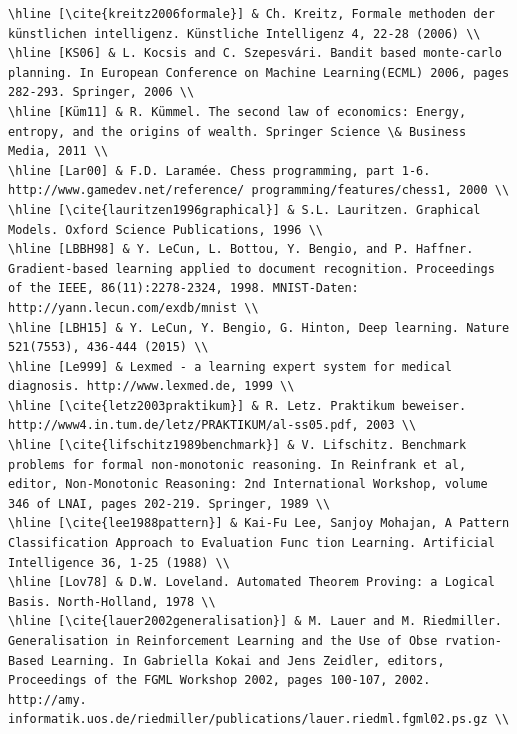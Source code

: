 \documentclass[10pt]{article}
\begin{document}
\begin{verbatim}
\hline [\cite{kreitz2006formale}] & Ch. Kreitz, Formale methoden der künstlichen intelligenz. Künstliche Intelligenz 4, 22-28 (2006) \\
\hline [KS06] & L. Kocsis and C. Szepesvári. Bandit based monte-carlo planning. In European Conference on Machine Learning(ECML) 2006, pages 282-293. Springer, 2006 \\
\hline [Küm11] & R. Kümmel. The second law of economics: Energy, entropy, and the origins of wealth. Springer Science \& Business Media, 2011 \\
\hline [Lar00] & F.D. Laramée. Chess programming, part 1-6. http://www.gamedev.net/reference/ programming/features/chess1, 2000 \\
\hline [\cite{lauritzen1996graphical}] & S.L. Lauritzen. Graphical Models. Oxford Science Publications, 1996 \\
\hline [LBBH98] & Y. LeCun, L. Bottou, Y. Bengio, and P. Haffner. Gradient-based learning applied to document recognition. Proceedings of the IEEE, 86(11):2278-2324, 1998. MNIST-Daten: http://yann.lecun.com/exdb/mnist \\
\hline [LBH15] & Y. LeCun, Y. Bengio, G. Hinton, Deep learning. Nature 521(7553), 436-444 (2015) \\
\hline [Le999] & Lexmed - a learning expert system for medical diagnosis. http://www.lexmed.de, 1999 \\
\hline [\cite{letz2003praktikum}] & R. Letz. Praktikum beweiser. http://www4.in.tum.de/letz/PRAKTIKUM/al-ss05.pdf, 2003 \\
\hline [\cite{lifschitz1989benchmark}] & V. Lifschitz. Benchmark problems for formal non-monotonic reasoning. In Reinfrank et al, editor, Non-Monotonic Reasoning: 2nd International Workshop, volume 346 of LNAI, pages 202-219. Springer, 1989 \\
\hline [\cite{lee1988pattern}] & Kai-Fu Lee, Sanjoy Mohajan, A Pattern Classification Approach to Evaluation Func tion Learning. Artificial Intelligence 36, 1-25 (1988) \\
\hline [Lov78] & D.W. Loveland. Automated Theorem Proving: a Logical Basis. North-Holland, 1978 \\
\hline [\cite{lauer2002generalisation}] & M. Lauer and M. Riedmiller. Generalisation in Reinforcement Learning and the Use of Obse rvation-Based Learning. In Gabriella Kokai and Jens Zeidler, editors, Proceedings of the FGML Workshop 2002, pages 100-107, 2002. http://amy. informatik.uos.de/riedmiller/publications/lauer.riedml.fgml02.ps.gz \\

\end{verbatim}
\end{document}
